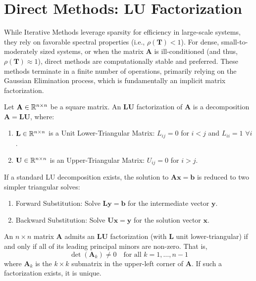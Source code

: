 \newpage
\section{Direct Methods: LU Factorization}

While Iterative Methods leverage sparsity for efficiency in large-scale systems, they rely on favorable spectral properties (i.e., $\rho(\mathbf{T}) < 1$). For dense, small-to-moderately sized systems, or when the matrix $\mathbf{A}$ is ill-conditioned (and thus, $\rho(\mathbf{T}) \approx 1$), direct methods are computationally stable and preferred. These methods terminate in a finite number of operations, primarily relying on the Gaussian Elimination process, which is fundamentally an implicit matrix factorization.

\begin{definition}[LU Factorization]
Let $\mathbf{A} \in \mathbb{R}^{n \times n}$ be a square matrix. An $\mathbf{LU}$ factorization of $\mathbf{A}$ is a decomposition $\mathbf{A} = \mathbf{L}\mathbf{U}$, where:
\begin{enumerate}
    \item $\mathbf{L} \in \mathbb{R}^{n \times n}$ is a Unit Lower-Triangular Matrix: $L_{ij} = 0$ for $i < j$ and $L_{ii} = 1$ $\forall i$.
    \item $\mathbf{U} \in \mathbb{R}^{n \times n}$ is an Upper-Triangular Matrix: $U_{ij} = 0$ for $i > j$.
\end{enumerate}
If a standard LU decomposition exists, the solution to $\mathbf{A}\mathbf{x} = \mathbf{b}$ is reduced to two simpler triangular solves:
\begin{enumerate}
    \item Forward Substitution: Solve $\mathbf{L}\mathbf{y} = \mathbf{b}$ for the intermediate vector $\mathbf{y}$.
    \item Backward Substitution: Solve $\mathbf{U}\mathbf{x} = \mathbf{y}$ for the solution vector $\mathbf{x}$.
\end{enumerate}
\end{definition}

\begin{theorem}
An $n \times n$ matrix $\mathbf{A}$ admits an $\mathbf{LU}$ factorization (with $\mathbf{L}$ unit lower-triangular) if and only if all of its leading principal minors are non-zero. That is,
\[ \det(\mathbf{A}_k) \ne 0 \quad \text{for all } k = 1, \dots, n-1 \]
where $\mathbf{A}_k$ is the $k \times k$ submatrix in the upper-left corner of $\mathbf{A}$.
If such a factorization exists, it is unique.
\end{theorem}


